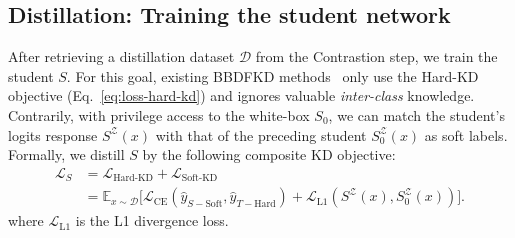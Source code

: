 \subsection{Distillation: Training the student network} \label{ssec:03-framework-distillation}
\begin{foldable}
    After retrieving a distillation dataset $\mathcal{D}$ from the Contrastion step, we train the student $S$.
    For this goal, existing BBDFKD methods~\cite{zhang2022ideal, yuan2024data} only use the Hard-KD objective (Eq.~\ref{eq:loss-hard-kd}) and ignores valuable \textit{inter-class} knowledge.
    Contrarily, with privilege access to the white-box $S_0$, we can match the student's logits response $S^{\mathcal{Z}}\left(x\right)$ with that of the preceding student $S_{0}^{\mathcal{Z}}\left(x\right)$ as soft labels.
    Formally, we distill $S$ by the following composite KD objective:
    \begin{equation} \label{eq:loss-kd-total}
        \begin{aligned}
            \mathcal{L}_{S} & =\mathcal{L}_{\text{Hard-KD}}+\mathcal{L}_{\text{Soft-KD}} \\
                & = \mathbb{E}_{x\sim\mathcal{D}}\Big[\mathcal{L}_{\text{CE}}\left(\hat{y}_{S-\text{Soft}},\hat{y}_{T-\text{Hard}}\right) + \mathcal{L}_{\text{L1}}\left(S^{\mathcal{Z}}\left(x\right),S_{0}^{\mathcal{Z}}\left(x\right)\right)\Big].
        \end{aligned}
    \end{equation}
    where $\mathcal{L}_{\text{L1}}$ is the L1 divergence loss.
\end{foldable}


